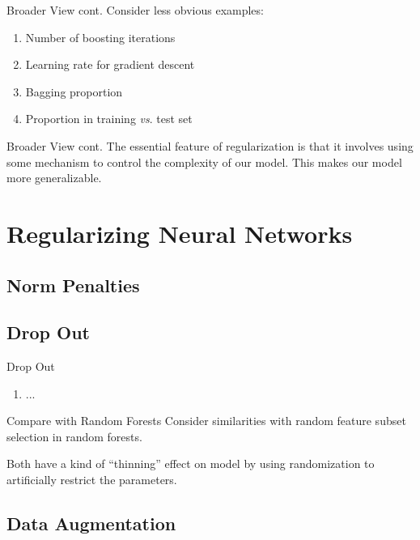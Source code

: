 \documentclass[pdf]{beamer}
\begin{document}
		\begin{frame}{Broader View cont.}
		Consider less obvious examples: \newline
		
		\begin{enumerate}
			\item Number of boosting iterations 
			\item Learning rate for gradient descent 
			\item Bagging proportion
			\item Proportion in training \textit{vs}. test set
		\end{enumerate}
		\end{frame}		
	
		\begin{frame}{Broader View cont.}
		The essential feature of regularization is that it involves using some mechanism to control the complexity of our model. This makes our model more generalizable. 
		\end{frame}		
			
\section{Regularizing Neural Networks}
	\subsection{Norm Penalties}
	
	
	\subsection{Drop Out}
		
		\begin{frame}{Drop Out}
		\begin{enumerate}
			\item ...
		\end{enumerate}
		\end{frame}
		
		\begin{frame}{Compare with Random Forests}
		Consider similarities with random feature subset selection in random forests. \newline 
		
		 Both have a kind of ``thinning'' effect on model by using randomization to artificially restrict the parameters.   
		\end{frame}

	\subsection{Data Augmentation}
		
\end{document}
